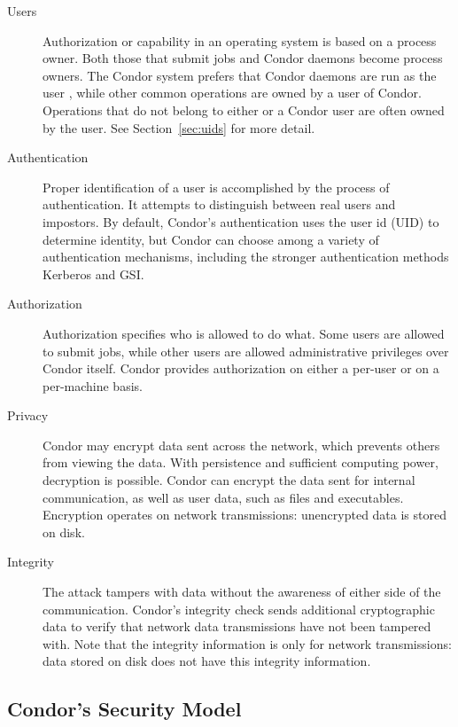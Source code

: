 \begin{description}

\item[Users] Authorization or capability in an operating system is
based on a process owner.
Both those that submit jobs and Condor daemons
become process owners.
The Condor system prefers that Condor daemons are run as the user
, while other common operations are owned by a
user of Condor.
Operations that do not belong to either  or a Condor user
are often owned by the  user.
See Section~\ref{sec:uids} for more detail.

\item[Authentication] 
Proper identification of a user is accomplished by the
process of authentication.
It attempts to distinguish between real users and impostors.
By default, Condor's authentication uses the user id (UID)
to determine identity,
but Condor can choose among a variety of authentication mechanisms,
including the stronger  authentication methods Kerberos and GSI.

\item[Authorization] Authorization specifies who is allowed
to do what.
Some users are allowed to submit jobs,
while other users are allowed administrative privileges over Condor itself.
Condor provides authorization on either a per-user or on
a per-machine basis.

\item[Privacy] Condor may encrypt data sent across the network, which
prevents others from viewing the data.
With persistence and sufficient computing power,
decryption is possible. 
Condor can encrypt the data sent for internal communication, 
as well as user data, such as files and executables.
Encryption operates on network
transmissions: unencrypted data is stored on disk.

\item[Integrity] 
The   attack tampers with data
without the awareness of either side of the communication.
Condor's integrity check sends additional cryptographic data
to verify that network data transmissions have not been
tampered with.
Note that the integrity information is only for network
transmissions: data stored on disk does not have this integrity
information. 

\end{description}


\subsection{\label{sec:Config-Security}Condor's Security Model}

